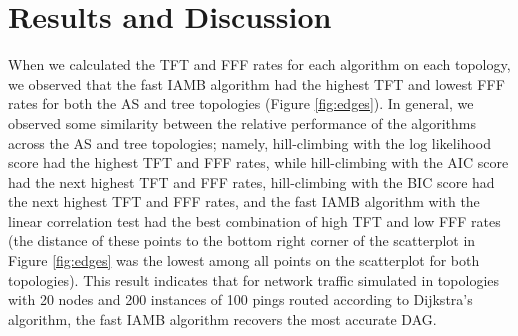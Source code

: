 \documentclass[conference]{IEEEtran}
\begin{document}
\section{Results and Discussion}

When we calculated the TFT and FFF rates for each algorithm on each topology, we observed that the fast IAMB algorithm had the highest TFT and lowest FFF rates for both the AS and tree topologies (Figure \ref{fig:edges}). In general, we observed some similarity between the relative performance of the algorithms across the AS and tree topologies; namely, hill-climbing with the log likelihood score had the highest TFT and FFF rates, while hill-climbing with the AIC score had the next highest TFT and FFF rates, hill-climbing with the BIC score had the next highest TFT and FFF rates, and the fast IAMB algorithm with the linear correlation test had the best combination of high TFT and low FFF rates (the distance of these points to the bottom right corner of the scatterplot in Figure \ref{fig:edges} was the lowest among all points on the scatterplot for both topologies). This result indicates that for network traffic simulated in topologies with 20 nodes and 200 instances of 100 pings routed according to Dijkstra's algorithm, the fast IAMB algorithm recovers the most accurate DAG.
\end{document}
